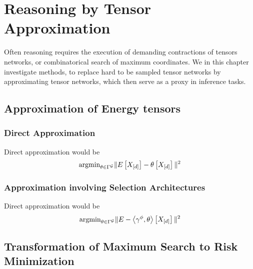 \section{Reasoning by Tensor Approximation}\label{cha:tensorApproximation}

Often reasoning requires the execution of demanding contractions of tensors networks, or combinatorical search of maximum coordinates.
We in this chapter investigate methods, to replace hard to be sampled tensor networks by approximating tensor networks, which then serve as a proxy in inference tasks.


\subsection{Approximation of Energy tensors}




\subsubsection{Direct Approximation}

Direct approximation would be
	\[ \mathrm{argmin}_{\theta\in\Gamma^{\mathcal{G}}} \|E\left[X_{[d]}\right] - \theta\left[X_{[d]}\right]\|^2 \]


\subsubsection{Approximation involving Selection Architectures}

Direct approximation would be
	\[ \mathrm{argmin}_{\theta\in\Gamma^{\mathcal{G}}} \|E - \left\langle \gamma^{\phi},\theta\right\rangle \left[ X_{[d]} \right]\|^2 \]





\subsection{Transformation of Maximum Search to Risk Minimization}


